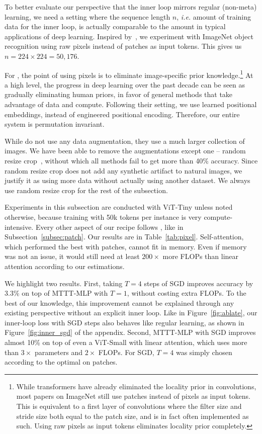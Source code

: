 \documentclass{article}
\begin{document}
To better evaluate our perspective that the inner loop mirrors regular (non-meta) learning, we need a setting where the sequence length $n$, \textit{i.e.} amount of training data for the inner loop, is actually comparable to the amount in typical applications of deep learning.
Inspired by~\cite{chen2020generative}, we experiment with ImageNet object recognition using raw pixels instead of patches as input tokens.
This gives us $n = 224 \times 224 = 50,176$.

For \cite{chen2020generative}, the point of using pixels is to eliminate image-specific prior knowledge.\footnote{
While transformers have already eliminated the locality prior in convolutions, most papers on ImageNet still use patches instead of pixels as input tokens.
This is equivalent to a first layer of convolutions where the filter size and stride size both equal to the patch size, and is in fact often implemented as such.
Using raw pixels as input tokens eliminates locality prior completely.
}
At a high level, the progress in deep learning over the past decade can be seen as gradually eliminating human priors, in favor of general methods that take advantage of data and compute.
Following their setting, we use learned positional embeddings, instead of engineered positional encoding.
Therefore, our entire system is permutation invariant.

While \cite{chen2020generative} do not use any data augmentation, they use a much larger collection of images. 
We have been able to remove the augmentations except one -- random resize crop~\citep{szegedy2015going}, without which all methods fail to get more than 40\% accuracy. 
Since random resize crop does not add any synthetic artifact to natural images, we justify it as using more data without actually using another dataset.
We always use random resize crop for the rest of the subsection.

Experiments in this subsection are conducted with ViT-Tiny unless noted otherwise, because training with 50k tokens per instance is very compute-intensive.
Every other aspect of our recipe follows \cite{beyer2022better}, like in Subsection~\ref{subsec:patch}.
Our results are in Table~\ref{tab:pixel}.
Self-attention, which performed the best with patches, cannot fit in memory. Even if memory was not an issue, it would still need at least $200\times$ more FLOPs than linear attention according to our estimations.

We highlight two results.
First, taking $T=4$ steps of SGD improves accuracy by 3.3\% on top of MTTT-MLP with $T=1$, without costing extra FLOPs.
To the best of our knowledge, this improvement cannot be explained through any existing perspective without an explicit inner loop.
Like in Figure~\ref{fig:ablate}, our inner-loop loss with SGD steps also behaves like regular learning, as shown in Figure~\ref{fig:inner_sgd} of the appendix.
Second, MTTT-MLP with SGD improves almost 10\% on top of even a ViT-Small with linear attention, which uses more than $3\times$ parameters and $2\times$ FLOPs.
For SGD, $T=4$ was simply chosen according to the optimal on patches.
\end{document}
